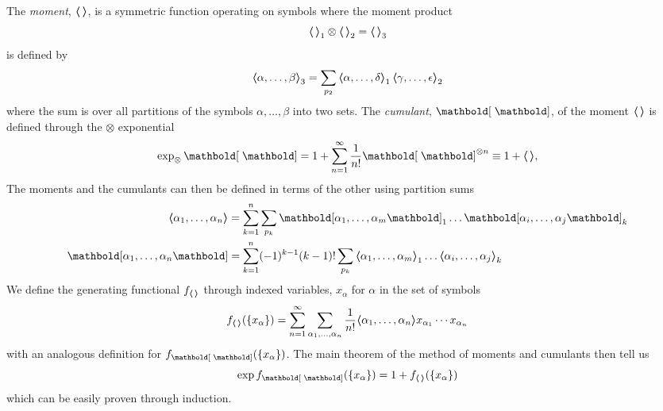 The \emph{moment}, $\moment$, is a symmetric function operating on symbols
where the moment product
%
\begin{equation}
  \moment_1 \otimes \moment_2 =  \moment_3
\end{equation}
%
is defined by
%
\begin{equation}
  \moment[\alpha, \dots, \beta]_3 = \sum_{p_2} \moment[\alpha, \dots, \delta]_1\,
    \moment[\gamma, \dots, \epsilon]_2
\end{equation}
%
where the sum is over all partitions of the symbols $\alpha, \dots, \beta$ into
two sets. The \emph{cumulant}, $\cumulant$, of the moment $\moment$ is defined
through the $\otimes$ exponential
%
\begin{equation}
  \exp_{\otimes} \cumulant = 1 + \sum_{n=1}^{\infty} \frac{1}{n!} \cumulant^{\otimes n}
    \equiv 1 + \moment,
\end{equation}
%
The moments and the cumulants can then be defined in terms of the other using
partition sums
%
\begin{align}
  \moment[\alpha_1, \dots, \alpha_n] &= \sum_{k=1}^{n} \sum_{p_k} \cumulant[\alpha_1, \dots, \alpha_m]_1
    \dots \cumulant[\alpha_i, \dots, \alpha_j]_k \\
  \cumulant[\alpha_1, \dots, \alpha_n] &= \sum_{k=1}^{n} (-1)^{k-1} (k-1)! \sum_{p_k} 
  \moment[\alpha_1, \dots, \alpha_m]_1
    \dots \moment[\alpha_i, \dots, \alpha_j]_k
\end{align}
%
We define the generating functional $f_{\moment}$ through
indexed variables, $x_{\alpha}$ for $\alpha$ in the set of symbols
%
\begin{equation}
  f_{\moment}(\{x_\alpha\}) = \sum_{n=1}^{\infty} \sum_{\alpha_1,\dots,\alpha_n}
    \frac{1}{n!} \moment[\alpha_1, \dots, \alpha_n] x_{\alpha_1} \cdots
    x_{\alpha_n}
\end{equation}
%
with an analogous definition for $f_{\cumulant}(\{x_\alpha\})$. The main theorem
of the method of moments and cumulants then tell us
%
\begin{equation} \label{eq:moment_cumulant_theorem}
  \exp f_{\cumulant}(\{x_{\alpha}\}) = 1 + f_{\moment}(\{x_{\alpha}\})
\end{equation}
%
which can be easily proven through induction.


